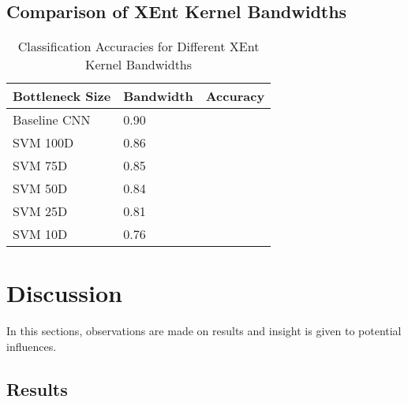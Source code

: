 \documentclass[conference]{IEEEtran}
\begin{document}
\subsection{Comparison of XEnt Kernel Bandwidths}

\begin{table}[h!]
	\caption{Classification Accuracies for Different XEnt Kernel Bandwidths}
	\label{tab:bw_comparison}
	\normalsize
	\begin{tabularx}{\columnwidth}{ |X|X|X| } 
		\hline
		\centering \textbf{Bottleneck Size}  & \textbf{Bandwidth} & \textbf{Accuracy} \\
		\hline
		\centering Baseline CNN & 0.90 \\
		\hline
		\centering SVM 100D & 0.86 \\
		\hline
		\centering SVM 75D & 0.85 \\
		\hline
		\centering SVM 50D & 0.84 \\
		\hline
		\centering SVM 25D & 0.81 \\
		\hline
		\centering SVM 10D & 0.76 \\
		\hline
	\end{tabularx}
\end{table} 

\vspace{5cm}
\section{Discussion} \label{Discussion}
In this sections, observations are made on results and insight is given to potential influences.










\subsection{Results}
\end{document}
